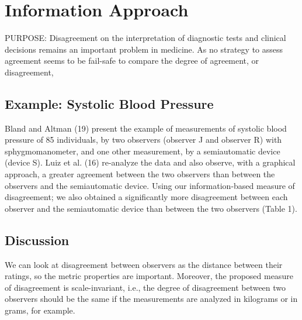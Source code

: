 \documentclass[Chap3bmain.tex]{subfiles}
\begin{document}
\section{Information Approach}

PURPOSE: Disagreement on the interpretation of diagnostic tests and clinical decisions 
remains an important problem in medicine. As no strategy to assess agreement seems to be 
fail-safe to compare the degree of agreement, or disagreement, 



\subsection{Example: Systolic Blood Pressure}
Bland and Altman (19) present the example of measurements of systolic blood pressure of 85 individuals, by two observers (observer J and observer R) with sphygmomanometer, and one other measurement, by a semiautomatic device (device S). Luiz et al. (16) re-analyze the data and also observe, with a graphical approach, a greater agreement between the two observers than between the observers and the semiautomatic device. Using our information-based measure of disagreement; we also obtained a significantly more
disagreement between each observer and the semiautomatic device than between the two observers (Table 1).


\subsection{Discussion}

We can look at disagreement between observers as the distance between their ratings, so the metric properties are important. Moreover, the proposed measure of disagreement is scale-invariant, i.e., the degree of disagreement between two observers should be the same if the measurements are analyzed in kilograms or in grams, for example.
\end{document}

